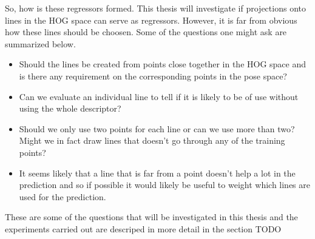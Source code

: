 \documentclass[a4paper,11pt]{kth-mag}
\begin{document}
So, how is these regressors formed.
This thesis will investigate if projections onto lines in the HOG space can serve as regressors.
However, it is far from obvious how these lines should be choosen.
Some of the questions one might ask are summarized below.
\begin{itemize}
\item
Should the lines be created from points close together in the HOG space and is there any requirement on the corresponding points in the pose space?
\item
Can we evaluate an individual line to tell if it is likely to be of use without using the whole descriptor?
\item
Should we only use two points for each line or can we use more than two? Might we in fact draw lines that doesn't go through any of the training points?
\item
It seems likely that a line that is far from a point doesn't help a lot in the prediction and so if possible it would likely be useful to weight which lines are used for the prediction.
\end{itemize}
These are some of the questions that will be investigated in this thesis and the experiments carried out are descriped in more detail in the section TODO %

{}


\appendix
\end{document}
